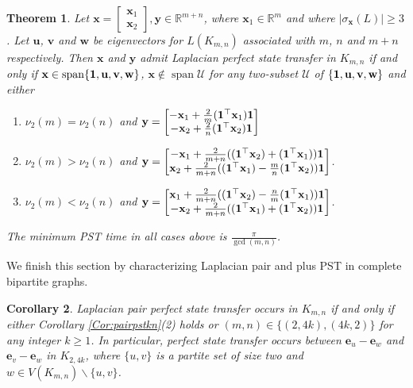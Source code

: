 \documentclass[11pt]{article}
\newtheorem{theorem}{Theorem}
\newtheorem{corollary}[theorem]{Corollary}
\newcommand{\ones}{{\bf{1}}}
\newcommand{\be}{\mathbf e}
\newcommand{\bv}{\mathbf v}
\newcommand{\bx}{\mathbf x}
\newcommand{\by}{\mathbf y}
\newcommand{\bu}{\mathbf u}
\newcommand{\bw}{\mathbf w}
\def\R{\mathbb{R}}
\begin{document}
\begin{theorem}
\label{Thm:kmnpstlap}
Let $\bx=\begin{bmatrix}
\bx_1 \\ \bx_2
\end{bmatrix},\by\in\R^{m+n}$, where $\bx_1\in\R^m$ and where $|\sigma_{\bx}(L)|\geq 3$. Let $\bu$, $\bv$ and $\bw$ be eigenvectors for $L(K_{m,n})$ associated with $m$, $n$ and $m+n$ respectively. Then $\bx$ and $\by$ admit Laplacian perfect state transfer in $K_{m,n}$ if and only if $\bx\in\operatorname{span}\{\ones,\bu,\bv,\bw\}$, $\bx\notin\operatorname{span}\mathcal{U}$ for any two-subset $\mathcal{U}$ of $\{\ones,\bu,\bv,\bw\}$ and either
\begin{enumerate}
\item $\nu_2(m)=\nu_2(n)$ and $\by=\begin{bmatrix}
-\bx_1+\frac{2}{m} (\ones^\top\bx_1)\ones \\ -\bx_2+\frac{2}{n} (\ones^\top\bx_2)\ones\end{bmatrix}$
\item $\nu_2(m)>\nu_2(n)$ and $\by=\begin{bmatrix}-\bx_1+\frac{2}{m+n} ((\ones^\top\bx_2)+(\ones^\top\bx_1))\ones\\
\bx_2+\frac{2}{m+n}((\ones^\top\bx_1)-\frac{m}{n} (\ones^\top\bx_2))\ones\end{bmatrix}$.
\item $\nu_2(m)<\nu_2(n)$ and 
$\by=\begin{bmatrix}
\bx_1+\frac{2}{m+n}((\ones^\top\bx_2)-\frac{n}{m}(\ones^\top\bx_1))\ones \\ -\bx_2+\frac{2}{m+n}((\ones^\top\bx_1)+(\ones^\top\bx_2))\ones\end{bmatrix}$.
\end{enumerate}
The minimum PST time in all cases above is $\frac{\pi}{\operatorname{gcd}(m,n)}$.
\end{theorem}

We finish this section by characterizing Laplacian pair and plus PST in complete bipartite graphs.

\begin{corollary}
\label{Cor:pairkmn}
Laplacian pair perfect state transfer occurs in $K_{m,n}$ if and only if either Corollary \ref{Cor:pairpstkn}(2) holds or $(m,n)\in\{(2,4k),(4k,2)\}$ for any integer $k\geq 1$. In particular, perfect state transfer occurs between $\be_u-\be_w$ and $\be_v-\be_w$ in $K_{2,4k}$, where $\{u,v\}$ is a partite set of size two and $w\in V(K_{m,n})\backslash\{u,v\}$.
\end{corollary}
\end{document}
